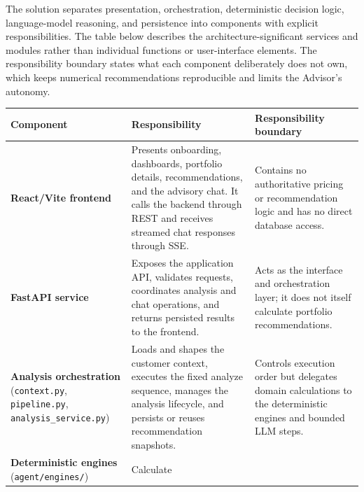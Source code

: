 \documentclass[
  11pt,
  a4paper,
  DIV=11,
  numbers=noendperiod,
  notitlepage]{scrreprt}
\newcounter{none} %
\begin{document}
The solution separates presentation, orchestration, deterministic
decision logic, language-model reasoning, and persistence into
components with explicit responsibilities. The table below describes the
architecture-significant services and modules rather than individual
functions or user-interface elements. The responsibility boundary states
what each component deliberately does not own, which keeps numerical
recommendations reproducible and limits the Advisor's autonomy.

{\def\LTcaptype{none} %
\begin{longtable}[]{@{}
  >{\raggedright\arraybackslash}p{}
  >{\raggedright\arraybackslash}p{}
  >{\raggedright\arraybackslash}p{}@{}}
\toprule\noalign{}
\begin{minipage}[b]{\linewidth}\raggedright
Component
\end{minipage} & \begin{minipage}[b]{\linewidth}\raggedright
Responsibility
\end{minipage} & \begin{minipage}[b]{\linewidth}\raggedright
Responsibility boundary
\end{minipage} \\
\midrule\noalign{}
\endhead
\bottomrule\noalign{}
\endlastfoot
\textbf{React/Vite frontend} & Presents onboarding, dashboards,
portfolio details, recommendations, and the advisory chat. It calls the
backend through REST and receives streamed chat responses through SSE. &
Contains no authoritative pricing or recommendation logic and has no
direct database access. \\
\textbf{FastAPI service} & Exposes the application API, validates
requests, coordinates analysis and chat operations, and returns
persisted results to the frontend. & Acts as the interface and
orchestration layer; it does not itself calculate portfolio
recommendations. \\
\textbf{Analysis orchestration} (\texttt{context.py},
\texttt{pipeline.py}, \texttt{analysis\_service.py}) & Loads and shapes
the customer context, executes the fixed analyze sequence, manages the
analysis lifecycle, and persists or reuses recommendation snapshots. &
Controls execution order but delegates domain calculations to the
deterministic engines and bounded LLM steps. \\
\textbf{Deterministic engines} (\texttt{agent/engines/}) & Calculate

\end{longtable}}
\end{document}
